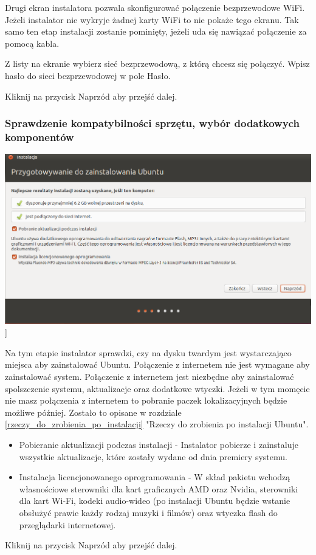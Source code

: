 Drugi ekran instalatora pozwala skonfigurować połączenie bezprzewodowe WiFi. Jeżeli instalator nie wykryje żadnej karty WiFi to nie pokaże tego ekranu. Tak samo ten etap instalacji zostanie pominięty, jeżeli uda się nawiązać połączenie za pomocą kabla.

Z listy na ekranie wybierz sieć bezprzewodową, z którą chcesz się połączyć. Wpisz hasło do sieci bezprzewodowej w pole \textcolor{ubuntu_orange}{Hasło}.
\begin{flushright}
Kliknij na przycisk \textcolor{ubuntu_orange}{Naprzód} aby przejść dalej.
\end{flushright}
\clearpage
\subsubsection{Sprawdzenie kompatybilności sprzętu, wybór dodatkowych komponentów}
\begin{center}
        \includegraphics[width=\linewidth]{images/instalator_wymagania.png}]
\end{center}

Na tym etapie instalator sprawdzi, czy na dysku twardym jest wystarczająco miejsca aby zainstalować Ubuntu. Połączenie z internetem nie jest wymagane aby zainstalować system. Połączenie z internetem jest niezbędne aby zainstalować spolszczenie systemu, aktualizacje oraz dodatkowe wtyczki. Jeżeli w tym momęcie nie masz połączenia z internetem to pobranie paczek lokalizacyjnych będzie możliwe później. Zostało to opisane w rozdziale \ref{rzeczy_do_zrobienia_po_instalacji} "Rzeczy do zrobienia po instalacji Ubuntu".
\begin{itemize}
\item \textcolor{ubuntu_orange}{Pobieranie aktualizacji podczas instalacji} - Instalator pobierze i zainstaluje wszystkie aktualizacje, które zostały wydane od dnia premiery systemu.
\item \textcolor{ubuntu_orange}{Instalacja licencjonowanego oprogramowania} - W skład pakietu wchodzą własnościowe sterowniki dla kart graficznych AMD oraz Nvidia, sterowniki dla kart Wi-Fi, kodeki audio-wideo (po instalacji Ubuntu będzie wstanie obsłużyć prawie każdy rodzaj muzyki i filmów) oraz wtyczka flash do przeglądarki internetowej.
\end{itemize}
\begin{flushright}
Kliknij na przycisk \textcolor{ubuntu_orange}{Naprzód} aby przejść dalej.
\end{flushright}
\clearpage
